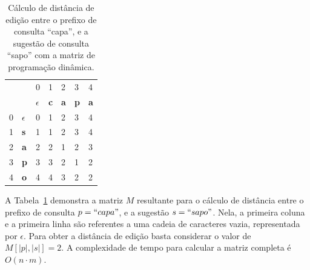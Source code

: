 \begin{table}[h]
\centering
\begin{tabular}{lllllll}
 &  & {\color[HTML]{C0C0C0} 0} & {\color[HTML]{C0C0C0} 1} & {\color[HTML]{C0C0C0} 2} & {\color[HTML]{C0C0C0} 3} & {\color[HTML]{C0C0C0} 4} \\
 &  & $\epsilon$ & \textbf{c} & \textbf{a} & \textbf{p} & \textbf{a} \\ \cline{3-7} 
{\color[HTML]{C0C0C0} 0} & \multicolumn{1}{l|}{$\epsilon$} & \multicolumn{1}{l|}{0} & \multicolumn{1}{l|}{1} & \multicolumn{1}{l|}{2} & \multicolumn{1}{l|}{3} & \multicolumn{1}{l|}{4} \\ \cline{3-7} 
{\color[HTML]{C0C0C0} 1} & \multicolumn{1}{l|}{\textbf{s}} & \multicolumn{1}{l|}{1} & \multicolumn{1}{l|}{1} & \multicolumn{1}{l|}{2} & \multicolumn{1}{l|}{3} & \multicolumn{1}{l|}{4} \\ \cline{3-7} 
{\color[HTML]{C0C0C0} 2} & \multicolumn{1}{l|}{\textbf{a}} & \multicolumn{1}{l|}{2} & \multicolumn{1}{l|}{2} & \multicolumn{1}{l|}{1} & \multicolumn{1}{l|}{2} & \multicolumn{1}{l|}{3} \\ \cline{3-7} 
{\color[HTML]{C0C0C0} 3} & \multicolumn{1}{l|}{\textbf{p}} & \multicolumn{1}{l|}{3} & \multicolumn{1}{l|}{3} & \multicolumn{1}{l|}{2} & \multicolumn{1}{l|}{1} & \multicolumn{1}{l|}{2} \\ \cline{3-7} 
{\color[HTML]{C0C0C0} 4} & \multicolumn{1}{l|}{\textbf{o}} & \multicolumn{1}{l|}{4} & \multicolumn{1}{l|}{4} & \multicolumn{1}{l|}{3} & \multicolumn{1}{l|}{2} & \multicolumn{1}{l|}{2} \\ \cline{3-7} 
\end{tabular}
\caption{Cálculo de distância de edição entre o prefixo de consulta ``capa'', e a sugestão de consulta ``sapo'' com a matriz de programação dinâmica.}
\label{tab:levenhstein_matrix_sequential_search}
\end{table}

A Tabela~\ref{tab:levenhstein_matrix_sequential_search} demonstra a matriz $M$ resultante para o cálculo de distância entre o prefixo de consulta $p = ``capa"$, e a sugestão $s = ``sapo"$. Nela, a primeira coluna e a primeira linha são referentes a uma cadeia de caracteres vazia, representada por $\epsilon$. Para obter a distância de edição basta considerar o valor de $M[|p|, |s|] = 2$. A complexidade de tempo para calcular a matriz completa é $O(n \cdot m)$. 

